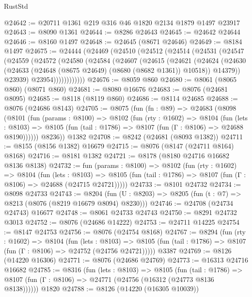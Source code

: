 \begin{lexlean}{RustStd}
\begin{coremodule}
@24642 := @20711 @1361 @219 @316 @46 @1820 @2134 @1879 @1497 @23917
@24643 := @8090 @1361
@24644 := @8286 @24643
@24645 := @24642 @24644
@24646 := @8160 @1497
@24648 := @24645 (@8671 @24646)
@24649 := @8184 @1497
@24675 := @24444
    (@24469
      (@24510
        (@24512
          (@24514
            (@24531
              (@24547
                (@24559
                  (@24572
                    (@24580
                      (@24584
                        (@24607
                          (@24615
                            (@24621
                              (@24624
                                (@24630
                                  (@24633 (@24648 (@8675 @24649) (@8680 (@8682 @1361)) @10518))
                                  @14379))
                              @23939)
                            @23954))))))))))))
@24676 := @8059 @860
@24680 := @8061 (@8065 @860) (@8071 @860)
@24681 := @8080 @16676
@24683 := @8076 (@24681 @8095)
@24685 := @8118 (@8119 @860)
@24686 := @8114 @24685
@24688 := @8076 (@24686 @8143)
@24705 := @8075
    (fun (fn : @89) =>
    @24683
      (@8098
        (@8101
          (fun (params : @8100) =>
          @8102
            (fun (rty : @1602) =>
            @8104
              (fun (lets : @8103) =>
              @8105 (fun (tail : @1786) => @8107 (fun (Γ : @8106) => @24688 @8190))))))
        @8236))
    @1382
@24708 := @8242 (@24681 (@8093 @1382))
@24711 := @8155 (@8156 @1382) @16679
@24715 := @8076 (@8147 (@24711 @8164) @8168)
@24716 := @8181 @1382
@24721 := @8178 (@8180 @24716 @16682 @8136 @8138)
@24732 := fun (params : @8100) =>
  @8102
    (fun (rty : @1602) =>
    @8104
      (fun (lets : @8103) =>
      @8105 (fun (tail : @1786) => @8107 (fun (Γ : @8106) => @24688 (@24715 @24721)))))
@24733 := @8101 @24732
@24734 := @8098 @24733
@24743 := @8204
    (fun (U : @8203) => @8205 (fun (t : @7) => @8213 (@8076 (@8219 @16679 @8094) @8230)))
@24746 := @24708 (@24734 @24743) @16677
@24748 := @8061 @24733 @24743
@24750 := @8291 @24732 @3013
@24752 := @8076 (@24686 @14222)
@24753 := @24711 @14225
@24754 := @8147 @24753
@24756 := @8076 (@24754 @8168)
@24767 := @8294
    (fun (rty : @1602) =>
    @8104
      (fun (lets : @8103) =>
      @8105 (fun (tail : @1786) => @8107 (fun (Γ : @8106) => @24752 (@24756 @24721)))))
    @3387
@24769 := @8126 (@14220 @16306)
@24771 := @8076 (@24686 @24769)
@24773 := @16313 @24716 @16682
@24785 := @8316
    (fun (lets : @8103) =>
    @8105
      (fun (tail : @1786) =>
      @8107 (fun (Γ : @8106) => @24771 (@24756 (@16312 (@24773 @8136 @8138))))))
    @1820
@24788 := @8126 (@14220 (@16305 @10039))

\end{coremodule}
\end{lexlean}
